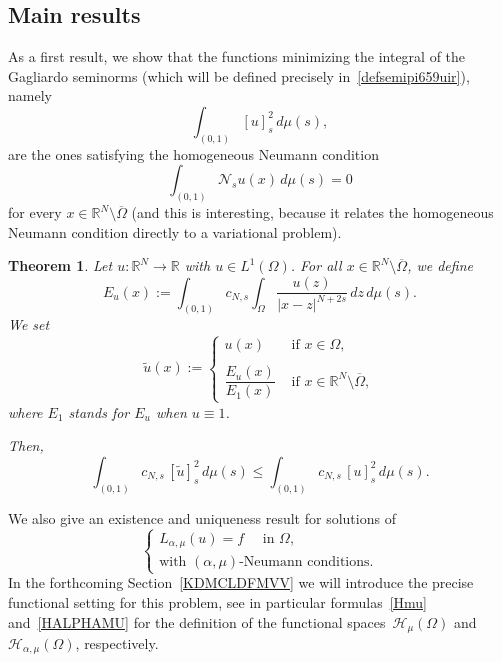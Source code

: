 \documentclass[12pt,a4paper,intlimits,sumlimits]{amsart}
\def \R {\mathbb{R}}
\def \Ns {\mathscr{N}_{s}}
\theoremstyle{definition}
\theoremstyle{plain}
\newtheorem{theorem}[definition]{Theorem}
\numberwithin{equation}{section}
\renewcommand{\le}{\leqslant}
\begin{document}
\subsection{Main results}
As a first result, we
show that the functions minimizing the integral of the Gagliardo seminorms
(which will be defined precisely in~\eqref{defsemipi659uir}), namely
\[
\int_{(0, 1)} [u]^2_s\,d\mu(s),
\]
are the ones satisfying the homogeneous Neumann condition
\begin{equation}\label{Neumannomogeneo}
\int_{(0, 1)} \Ns u(x) \,d\mu(s)=0
\end{equation}
for every $x\in \R^N\setminus \overline{\Omega}$ (and this is interesting, because
it relates the homogeneous Neumann condition directly to a variational problem).

\begin{theorem}\label{TH1ojc}
Let $u:\R^N\to \R$ with $u\in L^1(\Omega)$. For all $x\in \R^N\setminus \overline{\Omega}$, we define
\[
E_u(x):=\int_{(0, 1)}
c_{N,s}\int_\Omega \frac{u(z)}{|x-z|^{N+2s}}\,dz\,d\mu(s).
\]
We set
\begin{equation}\label{definizioneuutilde}
\tilde{u}(x):=
\begin{cases}
u(x)   & \mbox{ if } x\in \Omega,
\\ \\
\dfrac{E_u(x)}{E_1(x)}   &\mbox{ if } x\in\R^N\setminus \overline{\Omega},
\end{cases}
\end{equation}
where $E_1$ stands for $E_u$ when $u\equiv 1$. 

Then,
\begin{equation}\label{seminormagagliardo<}
\int_{(0, 1)}c_{N,s} \, [\widetilde u]_s^2 \,d\mu(s)\le \int_{(0, 1)}c_{N,s}\, [u]^2_s \,d\mu(s).
\end{equation}
\end{theorem}

We also give an existence and uniqueness result for solutions of
\begin{equation}\label{prob1p}
\begin{cases}
L_{\alpha, \mu}(u) = f\quad \mbox{ in } \Omega,\\
\mbox{with }(\alpha,\mu)\mbox{-Neumann conditions}.
\end{cases}
\end{equation}
In the forthcoming Section~\ref{KDMCLDFMVV} we will introduce
the precise functional setting for this problem,
see in particular formulas~\eqref{Hmu} and~\eqref{HALPHAMU} for the definition
of the functional spaces~$\mathcal H_\mu (\Omega)$ and~$\mathcal{H}_{\alpha,\mu}(\Omega)$, respectively.
\end{document}
